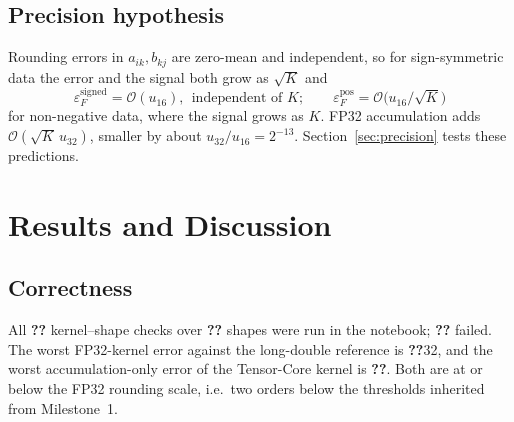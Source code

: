 \documentclass[conference]{IEEEtran}
\providecommand{\valFail}{\textbf{??}}
\providecommand{\valRows}{\textbf{??}}
\providecommand{\valShapes}{\textbf{??}}
\providecommand{\valWorstFP}{\textbf{??}}
\providecommand{\valWorstQuant}{\textbf{??}}
\begin{document}
\subsection{Precision hypothesis}
Rounding errors in $a_{ik},b_{kj}$ are zero-mean and independent, so for sign-symmetric data the error and the signal both grow as $\sqrt K$ and
\begin{equation}
\varepsilon_F^{\mathrm{signed}} = \mathcal{O}(u_{16}),\ \ \text{independent of }K;\qquad \varepsilon_F^{\mathrm{pos}} = \mathcal{O}\big(u_{16}/\sqrt K\big)\label{eq:err}
\end{equation}
for non-negative data, where the signal grows as $K$. FP32 accumulation adds $\mathcal{O}(\sqrt K\,u_{32})$, smaller by about $u_{32}/u_{16}=2^{-13}$. Section~\ref{sec:precision} tests these predictions.

\section{Results and Discussion}
\subsection{Correctness}\label{sec:correct}
All \valRows{} kernel--shape checks over \valShapes{} shapes were run in the notebook; \valFail{} failed. The worst FP32-kernel error against the long-double reference is \valWorstFP32{}, and the worst accumulation-only error of the Tensor-Core kernel is \valWorstQuant{}. Both are at or below the FP32 rounding scale, i.e.\ two orders below the thresholds inherited from Milestone~1.
\end{document}

